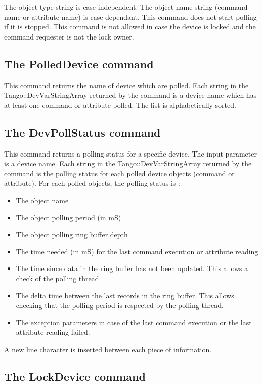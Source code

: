 \vspace{0.3cm}

The object type string is case independent. The object name string
(command name or attribute name) is case dependant. This command does
not start polling if it is stopped. This command is not allowed in
case the device is locked and the command requester is not the lock
owner.

\subsection{The PolledDevice command}

This command returns the name of device which are polled. Each string
in the Tango::DevVarStringArray returned by the command is a device
name which has at least one command or attribute polled. The list
is alphabetically sorted.

\subsection{The DevPollStatus command}

This command returns a polling status for a specific device. The input
parameter is a device name. Each string in the Tango::DevVarStringArray
returned by the command is the polling status for each polled device
objects (command or attribute). For each polled objects, the polling
status is :
\begin{itemize}
\item The object name
\item The object polling period (in mS)
\item The object polling ring buffer depth
\item The time needed (in mS) for the last command execution or attribute
reading
\item The time since data in the ring buffer has not been updated. This
allows a check of the polling thread
\item The delta time between the last records in the ring buffer. This allows
checking that the polling period is respected by the polling thread.
\item The exception parameters in case of the last command execution or
the last attribute reading failed.
\end{itemize}
A new line character is inserted between each piece of information.

\subsection{The LockDevice command}

